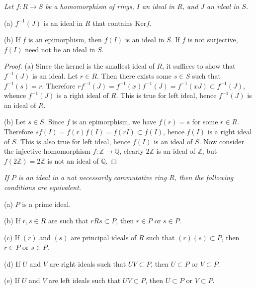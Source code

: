 \begin{problem}\em
Let $f:R\to S$ be a homomorphism of rings, $I$ an ideal in $R$, and $J$ an ideal in $S$.\par
(a) $f^{-1}(J)$ is an ideal in $R$ that contains $\mathrm{Ker}f$.\par
(b) If $f$ is an epimorphism, then $f(I)$ is an ideal in $S$. If $f$ is not surjective, $f(I)$ need not be an ideal in $S$.
\end{problem}
\begin{proof}
(a) Since the kernel is the smallest ideal of $R$, it suffices to show that $f^{-1}(J)$ is an ideal. Let $r\in R$. Then there exists some $s\in S$ such that $f^{-1}(s)=r$. Therefore $rf^{-1}(J)=f^{-1}(x)f^{-1}(J)=f^{-1}(xJ)\subset f^{-1}(J)$, whence $f^{-1}(J)$ is a right ideal of $R$. This is true for left ideal, hence $f^{-1}(J)$ is an ideal of $R$.\par
(b) Let $s\in S$. Since $f$ is an epimorphism, we have $f(r)=s$ for some $r\in R$. Therefore $sf(I)=f(r)f(I)=f(rI)\subset f(I)$, hence $f(I)$ is a right ideal of $S$. This is also true for left ideal, hence $f(I)$ is an ideal of $S$. Now consider the injective homomorphism $f:\mathbb{Z}\to\mathbb{Q}$, clearly $2\mathbb{Z}$ is an ideal of $\mathbb{Z}$, but $f(2\mathbb{Z})=2\mathbb{Z}$ is not an ideal of $\mathbb{Q}$.
\end{proof}
\begin{problem}\em
If $P$ is an ideal in a not necessarily commutative ring $R$, then the following conditions are equivalent.\par
(a) $P$ is a prime ideal.\par
(b) If $r,s\in R$ are such that $rRs\subset P$, then $r\in P$ or $s\in P$.\par
(c) If $(r)$ and $(s)$ are principal ideals of $R$ such that $(r)(s)\subset P$, then $r\in P$ or $s\in P$.\par
(d) If $U$ and $V$ are right ideals such that $UV\subset P$, then $U\subset P$ or $V\subset P$.\par
(e) If $U$ and $V$ are left ideals such that $UV\subset P$, then $U\subset P$ or $V\subset P$.
\end{problem}
